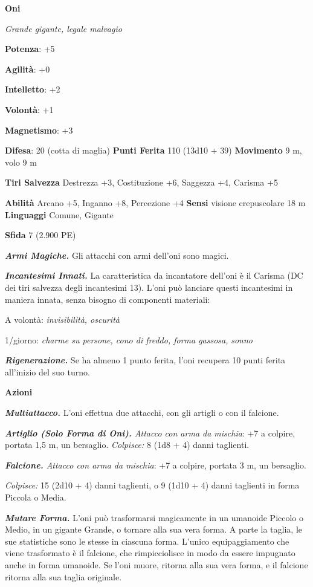 \begin{multicols}{2}
\textbf{Oni}

\emph{Grande gigante, legale malvagio}

\textbf{Potenza}: +5

\textbf{Agilità}: +0

\textbf{Intelletto}: +2

\textbf{Volontà}: +1

\textbf{Magnetismo}: +3

\textbf{Difesa}: 20 (cotta di maglia) \textbf{Punti Ferita} 110
(13d10 + 39) \textbf{Movimento} 9 m, volo 9 m

\textbf{Tiri Salvezza} Destrezza +3, Costituzione +6, Saggezza +4,
Carisma +5

\textbf{Abilità} Arcano +5, Inganno +8, Percezione +4 \textbf{Sensi}
visione crepuscolare 18 m \textbf{Linguaggi} Comune,
Gigante

\textbf{Sfida} 7 (2.900 PE)

\emph{\textbf{Armi Magiche.}} Gli attacchi con armi dell'oni sono
magici.

\emph{\textbf{Incantesimi Innati.}} La caratteristica da incantatore
dell'oni è il Carisma (DC dei tiri salvezza degli incantesimi 13). L'oni
può lanciare questi incantesimi in maniera innata, senza bisogno di
componenti materiali:

A volontà: \emph{invisibilità, oscurità}

1/giorno: \emph{charme su persone, cono di freddo, forma gassosa,}
\emph{sonno}

\emph{\textbf{Rigenerazione.}} Se ha almeno 1 punto ferita, l'oni
recupera 10 punti ferita all'inizio del suo turno.

\textbf{Azioni}

\emph{\textbf{Multiattacco.}} L'oni effettua due attacchi, con gli
artigli o con il falcione.

\emph{\textbf{Artiglio (Solo Forma di Oni).} Attacco con arma da
mischia}: +7 a colpire, portata 1,5 m, un bersaglio. \emph{Colpisce:} 8
(1d8 + 4) danni taglienti.

\emph{\textbf{Falcione.} Attacco con arma da mischia}: +7 a colpire,
portata 3 m, un bersaglio.

\emph{Colpisce:} 15 (2d10 + 4) danni taglienti, o 9 (1d10 + 4) danni
taglienti in forma Piccola o Media.

\emph{\textbf{Mutare Forma.}} L'oni può trasformarsi magicamente in un
umanoide Piccolo o Medio, in un gigante Grande, o tornare alla sua vera
forma. A parte la taglia, le sue statistiche sono le stesse in ciascuna
forma. L'unico equipaggiamento che viene trasformato è il falcione, che
rimpicciolisce in modo da essere impugnato anche in forma umanoide. Se
l'oni muore, ritorna alla sua vera forma, e il falcione ritorna alla sua
taglia originale.


\end{multicols}
